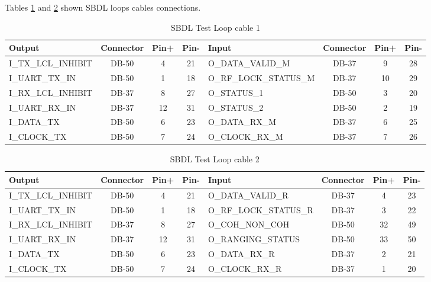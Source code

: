 Tables \ref{table:sbdl1} and \ref{table:sbdl2} shown SBDL loops cables connections.\\

\begin{table}[H]
    \begin{tabular}{lccclccc}
        Output              & Connector & Pin+ & Pin- & Input                  & Connector & Pin+ & Pin- \\\hline
        I\_TX\_LCL\_INHIBIT & DB-50     & 4    & 21   & O\_DATA\_VALID\_M      & DB-37     & 9    & 28   \\
        I\_UART\_TX\_IN     & DB-50     & 1    & 18   & O\_RF\_LOCK\_STATUS\_M & DB-37     & 10   & 29   \\
        I\_RX\_LCL\_INHIBIT & DB-37     & 8    & 27   & O\_STATUS\_1           & DB-50     & 3    & 20   \\
        I\_UART\_RX\_IN     & DB-37     & 12   & 31   & O\_STATUS\_2           & DB-50     & 2    & 19   \\
        I\_DATA\_TX         & DB-50     & 6    & 23   & O\_DATA\_RX\_M         & DB-37     & 6    & 25   \\
        I\_CLOCK\_TX        & DB-50     & 7    & 24   & O\_CLOCK\_RX\_M        & DB-37     & 7    & 26   \\
        
    \end{tabular}
    \caption{SBDL Test Loop cable 1}
    \label{table:sbdl1}
\end{table}

\begin{table}[H]
    \begin{tabular}{lccclccc}
        Output              & Connector & Pin+ & Pin- & Input                  & Connector & Pin+ & Pin- \\\hline
        I\_TX\_LCL\_INHIBIT & DB-50     & 4    & 21   & O\_DATA\_VALID\_R      & DB-37     & 4    & 23   \\
        I\_UART\_TX\_IN     & DB-50     & 1    & 18   & O\_RF\_LOCK\_STATUS\_R & DB-37     & 3    & 22   \\
        I\_RX\_LCL\_INHIBIT & DB-37     & 8    & 27   & O\_COH\_NON\_COH       & DB-50     & 32   & 49   \\
        I\_UART\_RX\_IN     & DB-37     & 12   & 31   & O\_RANGING\_STATUS     & DB-50     & 33   & 50   \\
        I\_DATA\_TX         & DB-50     & 6    & 23   & O\_DATA\_RX\_R         & DB-37     & 2    & 21   \\
        I\_CLOCK\_TX        & DB-50     & 7    & 24   & O\_CLOCK\_RX\_R        & DB-37     & 1    & 20   \\
    \end{tabular}
    \caption{SBDL Test Loop cable 2}
    \label{table:sbdl2}
\end{table}
